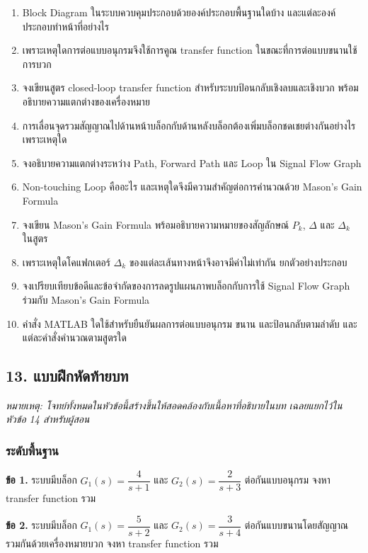 \begin{enumerate}
    \item Block Diagram ในระบบควบคุมประกอบด้วยองค์ประกอบพื้นฐานใดบ้าง และแต่ละองค์ประกอบทำหน้าที่อย่างไร
    \item เพราะเหตุใดการต่อแบบอนุกรมจึงใช้การคูณ transfer function ในขณะที่การต่อแบบขนานใช้การบวก
    \item จงเขียนสูตร closed-loop transfer function สำหรับระบบป้อนกลับเชิงลบและเชิงบวก พร้อมอธิบายความแตกต่างของเครื่องหมาย
    \item การเลื่อนจุดรวมสัญญาณไปด้านหน้าบล็อกกับด้านหลังบล็อกต้องเพิ่มบล็อกชดเชยต่างกันอย่างไร เพราะเหตุใด
    \item จงอธิบายความแตกต่างระหว่าง Path, Forward Path และ Loop ใน Signal Flow Graph
    \item Non-touching Loop คืออะไร และเหตุใดจึงมีความสำคัญต่อการคำนวณด้วย Mason's Gain Formula
    \item จงเขียน Mason's Gain Formula พร้อมอธิบายความหมายของสัญลักษณ์ $P_k$, $\Delta$ และ $\Delta_k$ ในสูตร
    \item เพราะเหตุใดโคแฟกเตอร์ $\Delta_k$ ของแต่ละเส้นทางหน้าจึงอาจมีค่าไม่เท่ากัน ยกตัวอย่างประกอบ
    \item จงเปรียบเทียบข้อดีและข้อจำกัดของการลดรูปแผนภาพบล็อกกับการใช้ Signal Flow Graph ร่วมกับ Mason's Gain Formula
    \item คำสั่ง MATLAB ใดใช้สำหรับยืนยันผลการต่อแบบอนุกรม ขนาน และป้อนกลับตามลำดับ และแต่ละคำสั่งคำนวณตามสูตรใด
\end{enumerate}

\newpage

\subsection{13. แบบฝึกหัดท้ายบท}

\textit{หมายเหตุ: โจทย์ทั้งหมดในหัวข้อนี้สร้างขึ้นให้สอดคล้องกับเนื้อหาที่อธิบายในบท เฉลยแยกไว้ในหัวข้อ 14 สำหรับผู้สอน}

\subsubsection{ระดับพื้นฐาน}

\textbf{ข้อ 1.} ระบบมีบล็อก $G_1(s)=\dfrac{4}{s+1}$ และ $G_2(s)=\dfrac{2}{s+3}$ ต่อกันแบบอนุกรม จงหา transfer function รวม

\textbf{ข้อ 2.} ระบบมีบล็อก $G_1(s)=\dfrac{5}{s+2}$ และ $G_2(s)=\dfrac{3}{s+4}$ ต่อกันแบบขนานโดยสัญญาณรวมกันด้วยเครื่องหมายบวก จงหา transfer function รวม

